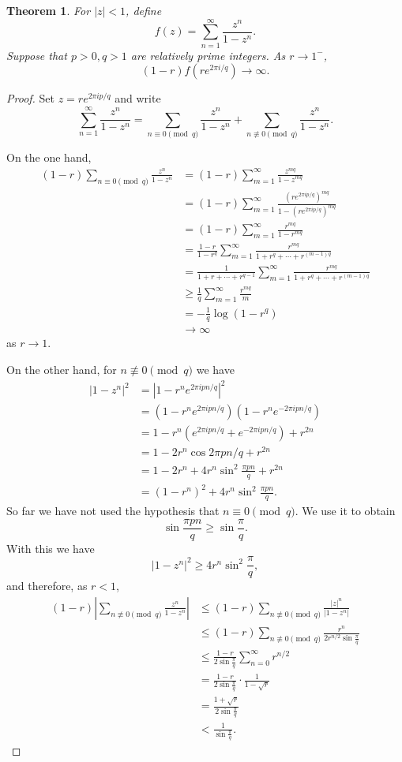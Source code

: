 \documentclass{amsart}
\newtheorem{theorem}{Theorem}
\begin{document}
\begin{theorem}
For $|z|<1$, define
\[
f(z) = \sum_{n=1}^\infty \frac{z^n}{1-z^n}.
\]
Suppose that $p>0, q>1$ are relatively prime integers.
As $r \to 1^-$,
\[
(1-r) f(r e^{2\pi i/q}) \to \infty.
\]  
\end{theorem}
\begin{proof}
Set $z=re^{2\pi i p/q}$ and write
\[
\sum_{n=1}^\infty \frac{z^n}{1-z^n} =
\sum_{n \equiv 0 \pmod{q}}   \frac{z^n}{1-z^n}
+ \sum_{n \not \equiv 0 \pmod{q}}  \frac{z^n}{1-z^n}.
\]

On the one hand, 
\begin{align*}
(1-r) \sum_{n \equiv 0 \pmod{q}}   \frac{z^n}{1-z^n}&=
(1-r) \sum_{m=1}^\infty \frac{z^{mq}}{1-z^{mq}}\\
&=(1-r) \sum_{m=1}^\infty \frac{(re^{2\pi i p/q})^{mq}}{1-(re^{2\pi i p/q})^{mq}}\\
&=(1-r) \sum_{m=1}^\infty \frac{r^{mq}}{1-r^{mq}}\\
&=\frac{1-r}{1-r^q} \sum_{m=1}^\infty \frac{r^{mq}}{1+r^q+\cdots+r^{(m-1)q}}\\
&=\frac{1}{1+r+\cdots+r^{q-1}} \sum_{m=1}^\infty \frac{r^{mq}}{1+r^q+\cdots+r^{(m-1)q}}\\
&\geq \frac{1}{q} \sum_{m=1}^\infty \frac{r^{mq}}{m}\\
&=-\frac{1}{q} \log(1-r^q)\\
&\to \infty
\end{align*}
as $r \to 1$.

On the other hand, for $n \not \equiv 0 \pmod{q}$ we have
\begin{align*}
|1-z^n|^2 &= |1-r^n e^{2\pi ipn/q}|^2\\
& = (1-r^n e^{2\pi ipn/q})(1-r^n e^{-2\pi i pn/q})\\
&=1-r^n(e^{2\pi ipn/q}+e^{-2\pi ipn/q}) +r^{2n}\\
&=1-2r^n \cos 2\pi pn/q + r^{2n}\\
&=1-2r^n + 4r^n \sin^2 \frac{\pi pn}{q} + r^{2n}\\
&= (1-r^n)^2 + 4r^n \sin^2 \frac{\pi pn}{q}.
\end{align*}
So far we have not used the hypothesis that $n \equiv 0 \pmod{q}$. We use it to obtain
\[
\sin \frac{\pi pn}{q} \geq \sin \frac{\pi}{q}.
\]
With this we have
\[
|1-z^n|^2 \geq 4r^n \sin^2 \frac{\pi}{q},
\]
and therefore, as $r<1$,
\begin{align*}
(1-r) \left| \sum_{n \not \equiv 0 \pmod{q}} \frac{z^n}{1-z^n} \right|&\leq
(1-r) \sum_{n \not \equiv 0 \pmod{q}} \frac{|z|^n}{|1-z^n|}\\
&\leq (1-r) \sum_{n \not \equiv 0 \pmod{q}} \frac{r^n}{2r^{n/2} \sin \frac{\pi}{q}}\\
&\leq \frac{1-r}{2 \sin \frac{\pi}{q}}  \sum_{n=0}^\infty r^{n/2}\\
&=\frac{1-r}{2 \sin \frac{\pi}{q}} \cdot \frac{1}{1-\sqrt{r}}\\
&=\frac{1+\sqrt{r}}{2\sin \frac{\pi}{q}}\\
&<\frac{1}{\sin \frac{\pi}{q}}.
\end{align*}
\end{proof}
\end{document}
